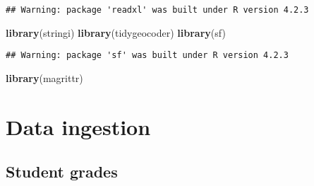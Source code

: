 \documentclass[
]{article}
\newenvironment{Shaded}{\begin{snugshade}}{\end{snugshade}}
\newcommand{\FunctionTok}[1]{\textcolor[rgb]{0.13,0.29,0.53}{\textbf{#1}}}
\newcommand{\NormalTok}[1]{#1}
\begin{document}
\begin{verbatim}
## Warning: package 'readxl' was built under R version 4.2.3
\end{verbatim}

\begin{Shaded}
\begin{Highlighting}[]
\FunctionTok{library}\NormalTok{(stringi)}
\FunctionTok{library}\NormalTok{(tidygeocoder)}
\FunctionTok{library}\NormalTok{(sf)}
\end{Highlighting}
\end{Shaded}

\begin{verbatim}
## Warning: package 'sf' was built under R version 4.2.3
\end{verbatim}

\begin{Shaded}
\begin{Highlighting}[]
\FunctionTok{library}\NormalTok{(magrittr)}
\end{Highlighting}
\end{Shaded}

\hypertarget{data-ingestion}{%
\section{Data ingestion}\label{data-ingestion}}

\hypertarget{student-grades}{%
\subsection{Student grades}\label{student-grades}}
\end{document}

